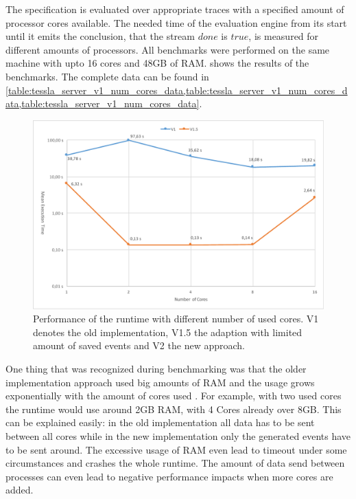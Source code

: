 The specification is evaluated over appropriate traces with a specified amount of processor cores available.
The needed time of the evaluation engine from its start until it emits the conclusion, that the stream \(\mathit{done}\) is \(\mathit{true}\), is measured for different amounts of processors.
All benchmarks were performed on the same machine  with upto 16 cores and 48GB of RAM.
 shows the results of the benchmarks.
The complete data can be found in \cref{table:tessla_server_v1_num_cores_data,table:tessla_server_v1_num_cores_data,table:tessla_server_v1_num_cores_data}.

\begin{figure}
  \includegraphics[width=\textwidth]{gfx/runtime_num_cores_benchmark}
  \caption[Performance of the runtime with different number of used cores]{Performance of the runtime with different number of used cores. V1 denotes the old implementation, V1.5 the adaption with limited amount of saved events and V2 the new approach.}
\label{fig:chap_eval:runtime_num_cores}
\end{figure}

One thing that was recognized during benchmarking was that the older implementation approach used big amounts of RAM and the usage grows exponentially with the amount of cores used .
For example, with two used cores the runtime would use around 2GB RAM, with 4 Cores already over 8GB.
This can be explained easily: in the old implementation all data has to be sent between all cores while in the new implementation only the generated events have to be sent around.
The excessive usage of RAM even lead to timeout under some circumstances and crashes the whole runtime.
The amount of data send between processes can even lead to negative performance impacts when more cores are added.

